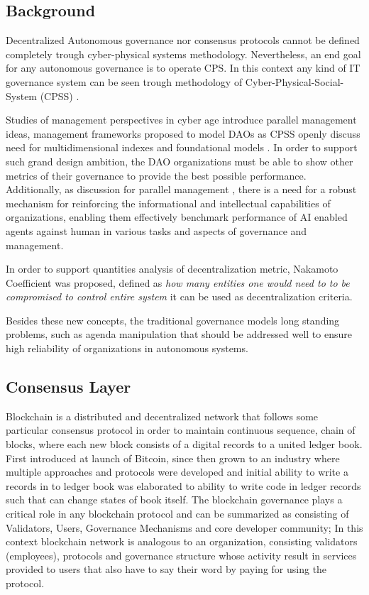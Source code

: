 \documentclass{article}
\begin{document}
\begin{CJK}{UTF8}{gbsn}
\begin{multicols}{2}
        \section{Background}
        Decentralized Autonomous governance nor consensus protocols cannot be defined completely trough cyber-physical systems \cite{Lee2008} methodology. Nevertheless, an end goal for any autonomous governance is to operate CPS. In this context any kind of IT governance system can be seen trough methodology of Cyber-Physical-Social-System (CPSS) \cite{Fei2016}.


        Studies of management perspectives in cyber age introduce parallel management \cite{Wang2022} ideas, management frameworks proposed to model DAOs as CPSS openly discuss need for multidimensional indexes and foundational models \cite{Juanjuan2023}. In order to support such grand design ambition, the DAO organizations must be able to show other metrics of their governance to provide the best possible performance. Additionally, as discussion for parallel management \cite{Wang2022}, there is a need for a robust mechanism for reinforcing the informational and intellectual capabilities of organizations, enabling them effectively benchmark performance of AI enabled agents against human in various tasks and aspects of governance and management.

        In order to support quantities analysis of decentralization metric, Nakamoto Coefficient\cite{Balaji2017} was proposed, defined as \textit{how many entities one would need to to be compromised to control entire system} it can be used as decentralization criteria.

        Besides these new concepts, the traditional governance models long standing problems, such as agenda manipulation \cite{McKelvey1976} that should be addressed well to ensure high reliability of organizations in autonomous systems.


        \subsection{Consensus Layer}
        Blockchain is a distributed and decentralized network that follows some particular consensus protocol in order to maintain continuous sequence, chain of blocks\cite{Merlinda2019}, where each new block consists of a digital records to a united ledger book. First introduced at launch of Bitcoin\cite{Satoshi}, since then grown to an industry where multiple approaches and protocols were developed and initial ability to write a records in to ledger book was elaborated to ability to write code in ledger records such that can change states of book itself.
        The blockchain governance plays a critical role in any blockchain protocol and can be summarized as consisting of Validators, Users, Governance Mechanisms and core developer community; In this context blockchain network is analogous to an organization, consisting validators (employees), protocols and governance structure whose activity result in services provided to users that also have to say their word by paying for using the protocol.


\end{multicols}
\end{CJK}
\end{document}
